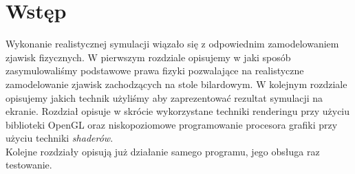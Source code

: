 \section{Wstęp}
Wykonanie realistycznej symulacji wiązało się z odpowiednim zamodelowaniem zjawisk fizycznych. W pierwszym rozdziale opisujemy w jaki sposób zasymulowaliśmy podstawowe prawa fizyki pozwalające na realistyczne zamodelowanie zjawisk zachodzących na stole bilardowym. W kolejnym rozdziale opisujemy jakich technik użyliśmy aby zaprezentować rezultat symulacji na ekranie. Rozdział opisuje w skrócie wykorzystane techniki renderingu przy użyciu biblioteki OpenGL oraz niskopoziomowe programowanie procesora grafiki przy użyciu techniki \textit{shaderów}.\\
Kolejne rozdziały opisują już działanie samego programu, jego obsługa raz testowanie.
